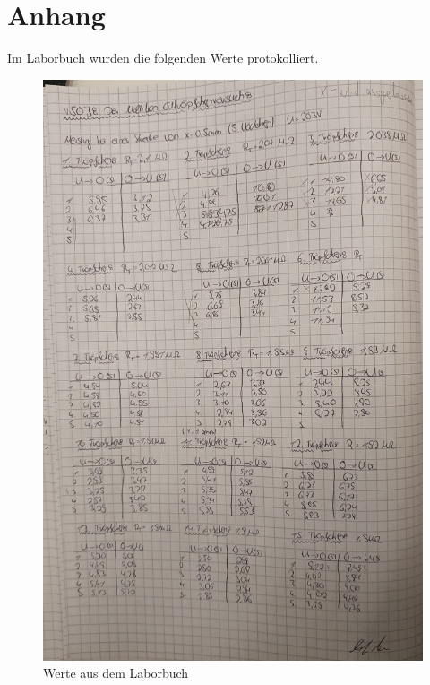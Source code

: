 \section{Anhang}

Im Laborbuch wurden die folgenden Werte protokolliert.

\begin{figure}
    \includegraphics[width=14cm]{Laborbuch.jpg}
    \caption{Werte aus dem Laborbuch}
\end{figure}















